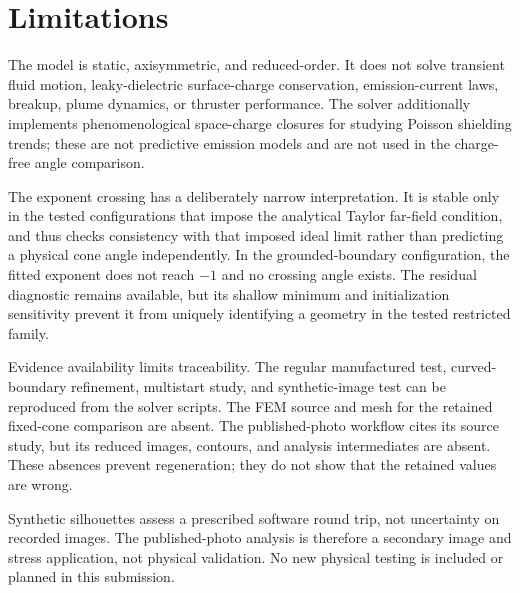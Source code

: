 \section{Limitations}

The model is static, axisymmetric, and reduced-order. It does not solve transient fluid motion, leaky-dielectric surface-charge conservation, emission-current laws, breakup, plume dynamics, or thruster performance. The solver additionally implements phenomenological space-charge closures for studying Poisson shielding trends; these are not predictive emission models and are not used in the charge-free angle comparison.

The exponent crossing has a deliberately narrow interpretation. It is stable only in the tested configurations that impose the analytical Taylor far-field condition, and thus checks consistency with that imposed ideal limit rather than predicting a physical cone angle independently. In the grounded-boundary configuration, the fitted exponent does not reach $-1$ and no crossing angle exists. The residual diagnostic remains available, but its shallow minimum and initialization sensitivity prevent it from uniquely identifying a geometry in the tested restricted family.

Evidence availability limits traceability. The regular manufactured test, curved-boundary refinement, multistart study, and synthetic-image test can be reproduced from the solver scripts. The FEM source and mesh for the retained fixed-cone comparison are absent. The published-photo workflow cites its source study, but its reduced images, contours, and analysis intermediates are absent. These absences prevent regeneration; they do not show that the retained values are wrong.

Synthetic silhouettes assess a prescribed software round trip, not uncertainty on recorded images. The published-photo analysis is therefore a secondary image and stress application, not physical validation. No new physical testing is included or planned in this submission.

